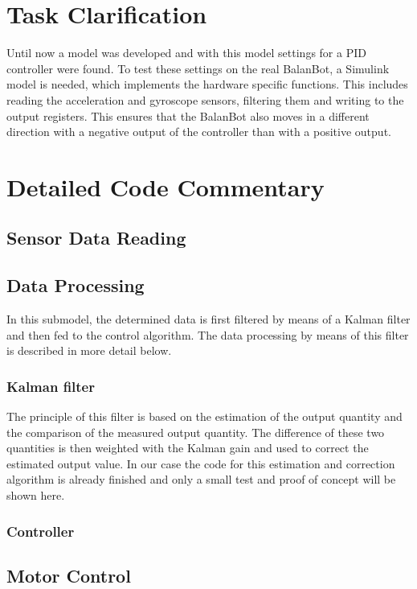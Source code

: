 \section{Task Clarification}
Until now a model was developed and with this model settings for a PID controller were found. To test these settings on the real BalanBot, a Simulink model is needed, which implements the hardware specific functions. This includes reading the acceleration and gyroscope sensors, filtering them and writing to the output registers. This ensures that the BalanBot also moves in a different direction with a negative output of the controller than with a positive output. 

\section{Detailed Code Commentary}
\subsection{Sensor Data Reading}


\subsection{Data Processing}
In this submodel, the determined data is first filtered by means of a Kalman filter and then fed to the control algorithm. The data processing by means of this filter is described in more detail below.
\subsubsection{Kalman filter}
The principle of this filter is based on the estimation of the output quantity and the comparison of the measured output quantity. The difference of these two quantities is then weighted with the Kalman gain and used to correct the estimated output value. In our case the code for this estimation and correction algorithm is already finished and only a small test and proof of concept will be shown here. 


\subsubsection{Controller}

\subsection{Motor Control}